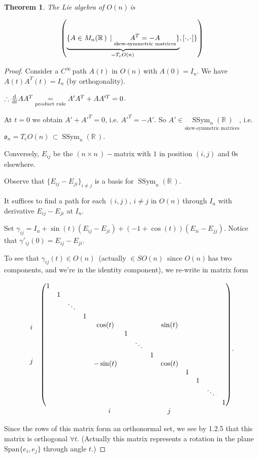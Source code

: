 \documentclass[12pt,a4paper]{article}
\newcommand{\rR}{\ensuremath{\mathbb{R}\,}}
\newcommand{\nn}{\ensuremath{n \times n\,}}
\newcommand{\cinf}{\ensuremath{C^{\infty}\,}}
\newcommand{\tqn}[2]{\ensuremath{T_{#1} {#2}}}
\newcommand{\mnr}{\ensuremath{M_n(\rR)\,}}
\newcommand{\gon}{\ensuremath{O(n)\,}}
\newcommand{\gson}{\ensuremath{SO(n)\,}}
\newcommand{\lgon}{\ensuremath{\mathfrak{o}_n}}
\newcommand{\ecomm}{\ensuremath{\comm{\cdot}{\cdot}}}
\newtheorem{thm}{Theorem}[subsubsection]
\begin{document}
\begin{thm}
The Lie algebra of \gon is 

\[\left(\underbrace{\{A\in \mnr \mid \underset{\text{skew-symmetric matrices}}{A^T=-A}\}}_{=\tqn{e}{\gon}}, \ecomm\}\right)\]
\end{thm}
\begin{proof}
Consider a \cinf path $A(t)$ in \gon with $A(0)=I_n$. We have $A(t)A^T(t)=I_n$ (by orthogonality).

$\therefore \dv{t}AA^T\underset{\text{product rule}}{=} A'A^T+AA'^T=0$.

At $t=0$ we obtain $A' + A'^T=0$, i.e. $A'^T=-A'$. So $A'\in \underset{\text{skew-symmetric matrices}}{\operatorname{SSym}_n(\rR)}$, i.e. $\lgon=\tqn{e}{\gon}\subset \operatorname{SSym}_n(\rR)$.

Conversely, $E_{ij}$ be the $(\nn)-$matrix with $1$ in position $(i,j)$ and $0$s elsewhere.

Observe that $\{E_{ij}-E_{ji}\}_{i\neq j}$ is a basis for $\operatorname{SSym}_n(\rR)$.

It suffices to find a path for each $(i,j)$, $i\neq j$ in \gon through $I_n$ with derivative $E_{ij}-E_{ji}$ at $I_n$.

Set $\gamma_{ij}=I_n+\sin(t)(E_{ij}-E_{ji})+(-1+\cos(t))(E_{ii}-E_{jj})$. Notice that $\gamma'_{ij}(0)=E_{ij}-E_{ji}$.

To see that $\gamma_{ij}(t)\in \gon$ (actually $\in \gson$ since \gon has two components, and we're in the identity component), we re-write in matrix form 


\[\mqty{
\mqty{i\\ {}\\ {}  \\ {}  \\ j} &
\pmqty{
\mqty{\dmat{1,1,\ddots,1}} & &\\
{}& \mqty{\cos(t) & & & &\sin(t)\\
 & 1 & & & \\
  &  &\ddots & & \\
   &  & & 1 & \\
   -\sin(t) & & & &\cos(t)
} &{}\\
{}&{} & \mqty{\dmat{1,1,\ddots,1}}
} \\
& \mqty{\quad i & \quad & \quad & \quad & \quad j}
}.\]

Since the rows of this matrix form an orthonormal set, we see by 1.2.5 that this matrix is orthogonal $\forall t$. (Actually this matrix represents a rotation in the plane $\mbox{Span}\{e_i,e_{j}\}$ through angle $t$.) 
\end{proof}
\end{document}
